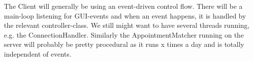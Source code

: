The Client will generally be using an event-driven control flow. There will be a main-loop listening for GUI-events and when an event happens, it is handled by the relevant controller-class. We still might want to have several threads running, e.g. the ConnectionHandler. Similarly the AppointmentMatcher running on the server will probably be pretty procedural as it runs x times a day and is totally independent of events.